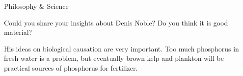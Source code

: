 \documentclass[11pt,oneside,openany,extrafontsizes]{memoir}
\begin{document}
\begin{qaexchange}{Philosophy \& Science}

    \begin{question}
        Could you share your insights about Denis Noble? Do you think it is good material? 
    \end{question}

    \begin{answer}
      His ideas on biological causation are very important. Too much phosphorus in fresh water is a problem, but eventually brown kelp and plankton will be practical sources of phosphorus for fertilizer.
    \end{answer}
\end{qaexchange}

\clearpage

\backmatter
\end{document}
